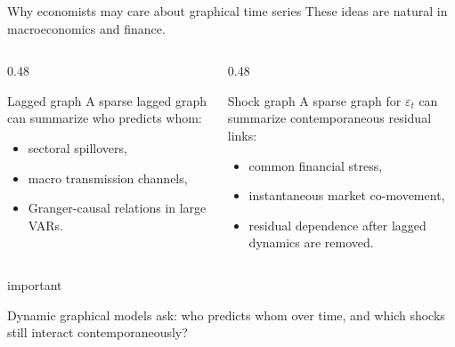 \documentclass[dvipsnames,aspectratio=169,handout]{beamer}
\begin{document}
\begin{frame}{Why economists may care about graphical time series}
These ideas are natural in macroeconomics and finance.

\begin{columns}[T]
\begin{column}{0.48\textwidth}
\begin{block}{Lagged graph}
A sparse lagged graph can summarize who predicts whom:
\begin{itemize}
    \item sectoral spillovers,
    \item macro transmission channels,
    \item Granger-causal relations in large VARs.
\end{itemize}
\end{block}
\end{column}

\begin{column}{0.48\textwidth}
\begin{block}{Shock graph}
A sparse graph for $\varepsilon_t$ can summarize contemporaneous residual links:
\begin{itemize}
    \item common financial stress,
    \item instantaneous market co-movement,
    \item residual dependence after lagged dynamics are removed.
\end{itemize}
\end{block}
\end{column}
\end{columns}

\begin{beamercolorbox}[wd=\textwidth,sep=7pt,center,rounded=true,shadow=true]{important}

Dynamic graphical models ask: who predicts whom over time, and which shocks still interact contemporaneously?
\end{beamercolorbox}
\end{frame}
\end{document}
